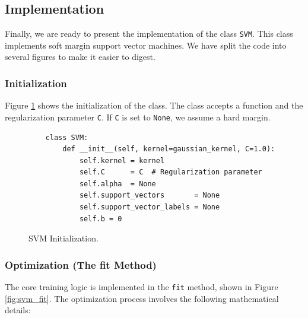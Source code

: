 \subsection{Implementation}
Finally, we are ready to present the implementation of the class \texttt{SVM}. This class implements soft
margin support vector machines.
We have split the code into several figures to make it easier to digest. 

\subsubsection{Initialization}
Figure \ref{fig:svm_init} shows the initialization of the class. The class accepts a  function and
the regularization parameter \texttt{C}. 
If \texttt{C} is set to \texttt{None}, we assume a hard margin.

\begin{figure}[!ht]
\centering
\begin{verbatim}
    class SVM:
        def __init__(self, kernel=gaussian_kernel, C=1.0):
            self.kernel = kernel
            self.C      = C  # Regularization parameter
            self.alpha  = None
            self.support_vectors       = None
            self.support_vector_labels = None
            self.b = 0
\end{verbatim}
\caption{SVM Initialization.}
\label{fig:svm_init}
\end{figure}

\subsubsection{Optimization (The fit Method)}
The core training logic is implemented in the \texttt{fit} method, shown in Figure \ref{fig:svm_fit}.
The optimization process involves the following mathematical details:

